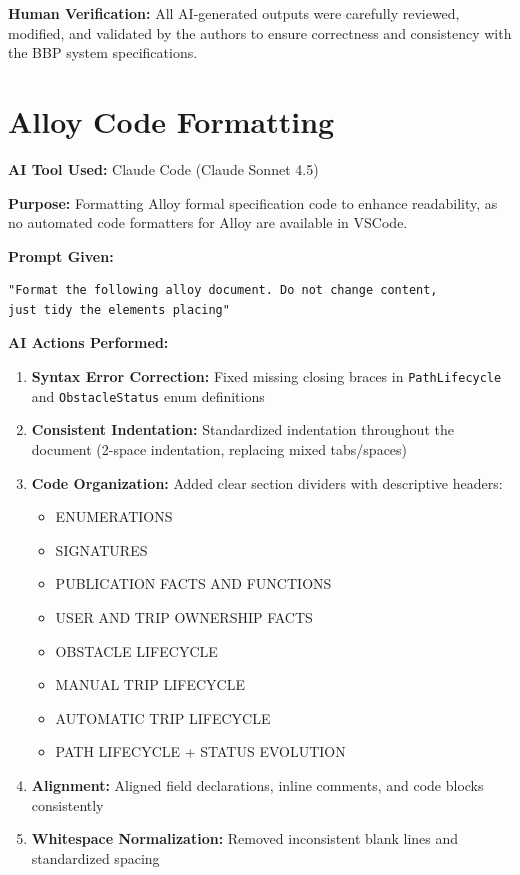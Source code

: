 \textbf{Human Verification:} All AI-generated outputs were carefully reviewed, modified, and validated by the authors to ensure correctness and consistency with the BBP system specifications.

\section{Alloy Code Formatting}

\textbf{AI Tool Used:} Claude Code (Claude Sonnet 4.5)

\textbf{Purpose:} Formatting Alloy formal specification code to enhance readability, as no automated code formatters for Alloy are available in VSCode.

\textbf{Prompt Given:}
\begin{verbatim}
"Format the following alloy document. Do not change content, 
just tidy the elements placing"
\end{verbatim}

\textbf{AI Actions Performed:}
\begin{enumerate}
    \item \textbf{Syntax Error Correction:} Fixed missing closing braces in \texttt{PathLifecycle} and \texttt{ObstacleStatus} enum definitions
    \item \textbf{Consistent Indentation:} Standardized indentation throughout the document (2-space indentation, replacing mixed tabs/spaces)
    \item \textbf{Code Organization:} Added clear section dividers with descriptive headers:
    \begin{itemize}
        \item ENUMERATIONS
        \item SIGNATURES
        \item PUBLICATION FACTS AND FUNCTIONS
        \item USER AND TRIP OWNERSHIP FACTS
        \item OBSTACLE LIFECYCLE
        \item MANUAL TRIP LIFECYCLE
        \item AUTOMATIC TRIP LIFECYCLE
        \item PATH LIFECYCLE + STATUS EVOLUTION
    \end{itemize}
    \item \textbf{Alignment:} Aligned field declarations, inline comments, and code blocks consistently
    \item \textbf{Whitespace Normalization:} Removed inconsistent blank lines and standardized spacing
\end{enumerate}

